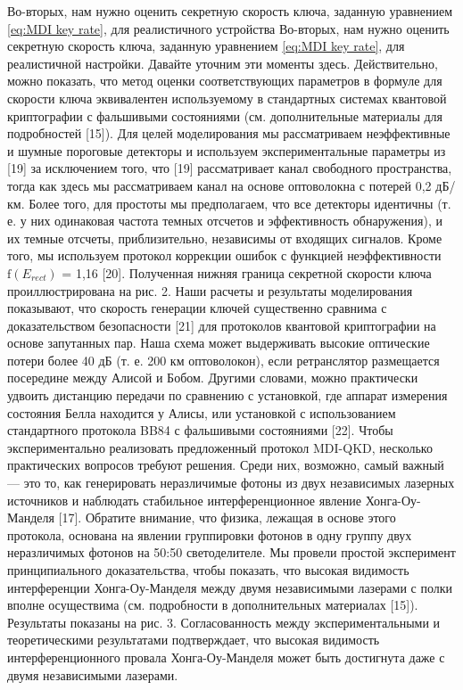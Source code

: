 \begin{figure}
\end{figure} \label{fig:key rate MDI lit}
Во-вторых, нам нужно оценить секретную скорость ключа, заданную уравнением \ref{eq:MDI key rate}, для реалистичного устройства 
Во-вторых, нам нужно оценить секретную скорость ключа, заданную уравнением \ref{eq:MDI key rate}, для реалистичной настройки. Давайте уточним эти моменты здесь. Действительно, можно показать, что метод оценки соответствующих параметров в формуле для скорости ключа эквивалентен используемому в стандартных системах квантовой криптографии с фальшивыми состояниями (см. дополнительные материалы для подробностей [15]). Для целей моделирования мы рассматриваем неэффективные и шумные пороговые детекторы и используем экспериментальные параметры из [19] за исключением того, что [19] рассматривает канал свободного пространства, тогда как здесь мы рассматриваем канал на основе оптоволокна с потерей 0,2 дБ/км. Более того, для простоты мы предполагаем, что все детекторы идентичны (т. е. у них одинаковая частота темных отсчетов и эффективность обнаружения), и их темные отсчеты, приблизительно, независимы от входящих сигналов. Кроме того, мы используем протокол коррекции ошибок с функцией неэффективности $\text{f}(E_{rect})$ = 1,16 [20]. Полученная нижняя граница секретной скорости ключа проиллюстрирована на рис. 2. Наши расчеты и результаты моделирования показывают, что скорость генерации ключей существенно сравнима с доказательством безопасности [21] для протоколов квантовой криптографии на основе запутанных пар. Наша схема может выдерживать высокие оптические потери более 40 дБ (т. е. 200 км оптоволокон), если ретранслятор размещается посередине между Алисой и Бобом. Другими словами, можно практически удвоить дистанцию передачи по сравнению с установкой, где аппарат измерения состояния Белла находится у Алисы, или установкой с использованием стандартного протокола BB84 с фальшивыми состояниями [22].
Чтобы экспериментально реализовать предложенный протокол MDI-QKD, несколько практических вопросов требуют решения. Среди них, возможно, самый важный — это то, как генерировать неразличимые фотоны из двух независимых лазерных источников и наблюдать стабильное интерференционное явление Хонга-Оу-Манделя [17]. Обратите внимание, что физика, лежащая в основе этого протокола, основана на явлении группировки фотонов в одну группу двух неразличимых фотонов на 50:50 светоделителе. Мы провели простой эксперимент принципиального доказательства, чтобы показать, что высокая видимость интерференции Хонга-Оу-Манделя между двумя независимыми лазерами с полки вполне осуществима (см. подробности в дополнительных материалах [15]). Результаты показаны на рис. 3. Согласованность между экспериментальными и теоретическими результатами подтверждает, что высокая видимость интерференционного провала Хонга-Оу-Манделя может быть достигнута даже с двумя независимыми лазерами.
